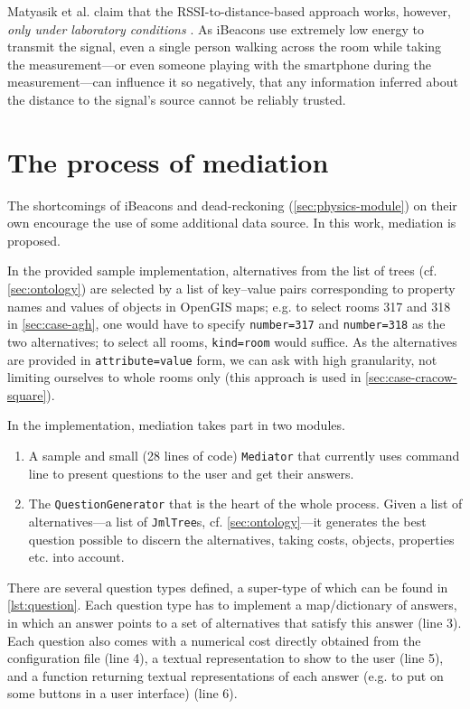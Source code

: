 Matyasik et al. claim that the RSSI-to-distance-based approach works, however, \emph{only under laboratory conditions} \cite{Matyasik:iBeacon, Matyasik:iBeacon:slides}. As iBeacons use extremely low energy to transmit the signal, even a single person walking across the room while taking the measurement---or even someone playing with the smartphone during the measurement---can influence it so negatively, that any information inferred about the distance to the signal's source cannot be reliably trusted.

\section{The process of mediation}
\label{sec:mediation}

The shortcomings of iBeacons and dead-reckoning (\cref{sec:physics-module}) on their own encourage the use of some additional data source. In this work, mediation is proposed.

In the provided sample implementation, alternatives from the list of trees (cf. \cref{sec:ontology}) are selected by a list of key--value pairs corresponding to property names and values of objects in OpenGIS maps; e.g. to select rooms 317 and 318 in \cref{sec:case-agh}, one would have to specify \texttt{number=317} and \texttt{number=318} as the two alternatives; to select all rooms, \texttt{kind=room} would suffice. As the alternatives are provided in \texttt{attribute=value} form, we can ask with high granularity, not limiting ourselves to whole rooms only (this approach is used in \cref{sec:case-cracow-square}).

In the implementation, mediation takes part in two modules.

\begin{enumerate}
	\item A sample and small (28 lines of code) \texttt{Mediator} that currently uses command line to present questions to the user and get their answers.
	\item The \texttt{QuestionGenerator} that is the heart of the whole process. Given a list of alternatives---a list of \texttt{JmlTree}s, cf. \cref{sec:ontology}---it generates the best question possible to discern the alternatives, taking costs, objects, properties etc. into account.
\end{enumerate}

There are several question types defined, a super-type of which can be found in \cref{lst:question}. Each question type has to implement a map/dictionary of answers, in which an answer points to a set of alternatives that satisfy this answer (line 3). Each question also comes with a numerical cost directly obtained from the configuration file (line 4), a textual representation to show to the user (line 5), and a function returning textual representations of each answer (e.g. to put on some buttons in a user interface) (line 6).

